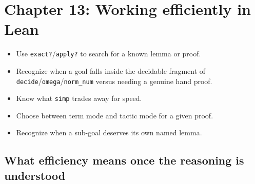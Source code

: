 \chapter{Chapter 13: Working efficiently in Lean}\label{sec:13-working-efficiently:00-index:1}

\begin{learningobjectives}
\begin{itemize}
\tightlist
\item
  Use \texttt{exact?}/\texttt{apply?} to search for a known lemma or proof.
\item
  Recognize when a goal falls inside the decidable fragment of \texttt{decide}/\texttt{omega}/\texttt{norm\_\allowbreak{}num} versus needing a genuine hand proof.
\item
  Know what \texttt{simp} trades away for speed.
\item
  Choose between term mode and tactic mode for a given proof.
\item
  Recognize when a sub-goal deserves its own named lemma.
\end{itemize}
\end{learningobjectives}


\section*{What efficiency means once the reasoning is understood}\label{sec:13-working-efficiently:00-index:2}

